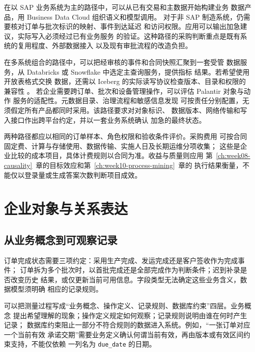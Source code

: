 在以 SAP 业务系统为主的路径中，可以从已有交易和主数据开始构建业务
数据产品，用 Business Data Cloud 组织语义和模型调用\cite{sapBDC2026}。
对于非 SAP 制造系统，仍需要核对订单与批次标识的映射、事件到达延迟
和访问权限。应用可以输出加急建议，实际写入必须经过已有业务服务
的验证。这种路径的采购判断重点是既有系统的复用程度、外部数据接入
以及现有审批流程的改造负担。

在多系统组合的路径中，可以把经审核的事件和合同快照汇聚到一套受管
数据服务，从 Databricks 或 Snowflake 中选定主查询服务，提供指标
结果\cite{databricksUnity2026,snowflakeSemantic2026}。若希望使用开放表格式交换
数据，还需以 Iceberg 的实际读写协议检查版本、目录和权限的兼容性
\cite{iceberg2026,databricksIceberg2026}。
若企业需要跨订单、批次和设备管理操作，可以评估 Palantir 对象与动作
服务的适配性\cite{palantirActions2026}。元数据目录、治理流程和敏感信息发现
可按责任分别配置，无须假定所有产品都同时采用。该路径要求对对象标识、
数据版本、网络传输和写入接口作出跨平台约定，并以一套业务系统确认
加急的最终状态。

两种路径都应以相同的订单样本、角色权限和验收条件评价。采购费用
可按合同固定费、计算与存储使用、数据传输、实施人日及长期运维分项收集；
这些是企业比较的成本项目，具体计费规则以合同为准。收益与质量则应用
第~\ref{ch:week08-causality}~章的目标效应和第~\ref{ch:week10-process-mining}~章的
执行结果衡量，不能仅以登录量或生成答案次数判断项目成效。

\section{企业对象与关系表达}
\label{sec:objects-relations}

\subsection{从业务概念到可观察记录}
订单完成状态需要三项约定：采用生产完成、发运完成还是客户签收作为完成事件；
订单拆为多个批次时，以首批完成还是全部完成作为判断条件；迟到补录是否改变历史
结果，或仅更新当前可用信息。字段类型无法确定这些业务含义，数据模型须明确
相应的记录规则。

可以把测量过程写成“业务概念、操作定义、记录规则、数据库约束”四层。业务概念
提出希望理解的现象；操作定义规定如何观察；记录规则说明由谁在何时产生记录；
数据库约束阻止一部分不符合规则的数据进入系统。例如，“一张订单对应一个当前有效
承诺交期”需要业务定义确认何谓当前有效，再由版本或有效区间约束支持，不能仅依赖
一列名为 \texttt{due\_date} 的日期。

